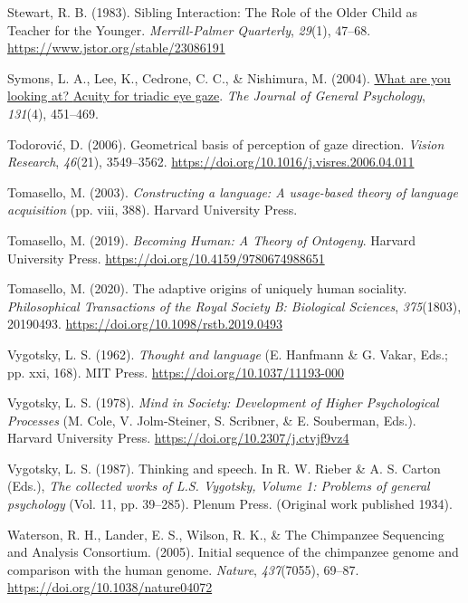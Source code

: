 \documentclass[
]{scrbook}
\newlength{\cslhangindent}
\newenvironment{CSLReferences}[2] %
 {\begin{list}{}{%
  \setlength{\itemindent}{0pt}
  \setlength{\leftmargin}{0pt}
  \setlength{\parsep}{0pt}
  \ifodd #1
   \setlength{\leftmargin}{\cslhangindent}
   \setlength{\itemindent}{-1\cslhangindent}
  \fi
  \setlength{\itemsep}{#2\baselineskip}}}
 {\end{list}}
\begin{document}
\begin{CSLReferences}{1}{0}
Stewart, R. B. (1983). Sibling {Interaction}: {The Role} of the {Older Child} as {Teacher} for the {Younger}. \emph{Merrill-Palmer Quarterly}, \emph{29}(1), 47--68. \url{https://www.jstor.org/stable/23086191}

Symons, L. A., Lee, K., Cedrone, C. C., \& Nishimura, M. (2004). \href{https://www.ncbi.nlm.nih.gov/pmc/articles/PMC2564292}{What are you looking at? {Acuity} for triadic eye gaze}. \emph{The Journal of General Psychology}, \emph{131}(4), 451--469.

Todorović, D. (2006). Geometrical basis of perception of gaze direction. \emph{Vision Research}, \emph{46}(21), 3549--3562. \url{https://doi.org/10.1016/j.visres.2006.04.011}

Tomasello, M. (2003). \emph{Constructing a language: {A} usage-based theory of language acquisition} (pp. viii, 388). Harvard University Press.

Tomasello, M. (2019). \emph{Becoming {Human}: {A Theory} of {Ontogeny}}. Harvard University Press. \url{https://doi.org/10.4159/9780674988651}

Tomasello, M. (2020). The adaptive origins of uniquely human sociality. \emph{Philosophical Transactions of the Royal Society B: Biological Sciences}, \emph{375}(1803), 20190493. \url{https://doi.org/10.1098/rstb.2019.0493}

Vygotsky, L. S. (1962). \emph{Thought and language} (E. Hanfmann \& G. Vakar, Eds.; pp. xxi, 168). MIT Press. \url{https://doi.org/10.1037/11193-000}

Vygotsky, L. S. (1978). \emph{Mind in {Society}: {Development} of {Higher Psychological Processes}} (M. Cole, V. Jolm-Steiner, S. Scribner, \& E. Souberman, Eds.). Harvard University Press. \url{https://doi.org/10.2307/j.ctvjf9vz4}

Vygotsky, L. S. (1987). Thinking and speech. In R. W. Rieber \& A. S. Carton (Eds.), \emph{The collected works of {L}.{S}. {Vygotsky}, {Volume} 1: {Problems} of general psychology} (Vol. 11, pp. 39--285). Plenum Press. (Original work published 1934).

Waterson, R. H., Lander, E. S., Wilson, R. K., \& The Chimpanzee Sequencing and Analysis Consortium. (2005). Initial sequence of the chimpanzee genome and comparison with the human genome. \emph{Nature}, \emph{437}(7055), 69--87. \url{https://doi.org/10.1038/nature04072}


\end{CSLReferences}
\end{document}
